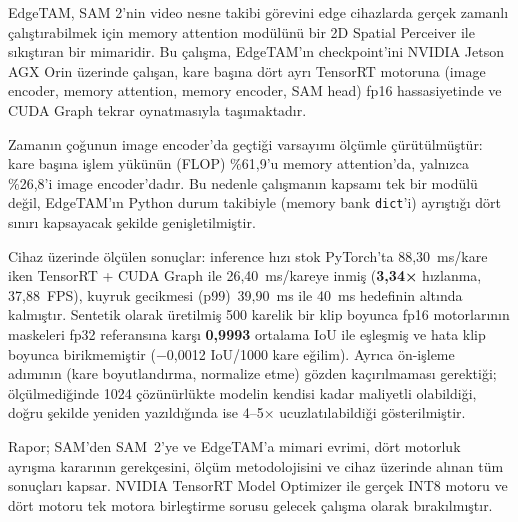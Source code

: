 EdgeTAM, SAM 2'nin video nesne takibi görevini edge cihazlarda
gerçek zamanlı çalıştırabilmek için memory attention modülünü bir 2D
Spatial Perceiver ile sıkıştıran bir mimaridir. Bu çalışma, EdgeTAM'ın
checkpoint'ini NVIDIA Jetson AGX Orin üzerinde çalışan,
kare başına dört ayrı TensorRT motoruna (image encoder, memory
attention, memory encoder, SAM head) fp16 hassasiyetinde ve CUDA Graph
tekrar oynatmasıyla taşımaktadır.

Zamanın çoğunun image encoder'da geçtiği varsayımı ölçümle
çürütülmüştür: kare başına işlem yükünün (FLOP) \%61,9'u memory
attention'da, yalnızca \%26,8'i image encoder'dadır. Bu nedenle
çalışmanın kapsamı tek bir modülü değil, EdgeTAM'ın Python durum takibiyle
(memory bank \texttt{dict}'i) ayrıştığı dört sınırı kapsayacak şekilde
genişletilmiştir.

Cihaz üzerinde ölçülen sonuçlar: inference hızı stok PyTorch'ta
88,30~ms/kare iken TensorRT + CUDA Graph ile 26,40~ms/kareye
inmiş (\textbf{3,34×} hızlanma, 37,88~FPS), kuyruk gecikmesi
(p99)~39,90~ms ile 40~ms hedefinin altında kalmıştır. Sentetik olarak
üretilmiş 500 karelik bir klip boyunca fp16 motorlarının maskeleri fp32 referansına karşı
\textbf{0,9993} ortalama IoU ile eşleşmiş ve hata klip boyunca
birikmemiştir (−0,0012 IoU/1000 kare eğilim). Ayrıca ön-işleme
adımının (kare boyutlandırma, normalize etme) gözden kaçırılmaması
gerektiği; ölçülmediğinde 1024 çözünürlükte modelin kendisi kadar maliyetli
olabildiği, doğru şekilde yeniden yazıldığında ise 4--5× ucuzlatılabildiği
gösterilmiştir.

Rapor; SAM'den SAM~2'ye ve EdgeTAM'a mimari evrimi, dört motorluk ayrışma
kararının gerekçesini, ölçüm metodolojisini ve cihaz üzerinde alınan
tüm sonuçları kapsar. NVIDIA TensorRT Model Optimizer ile gerçek INT8
motoru ve dört motoru tek motora birleştirme sorusu gelecek çalışma
olarak bırakılmıştır.

